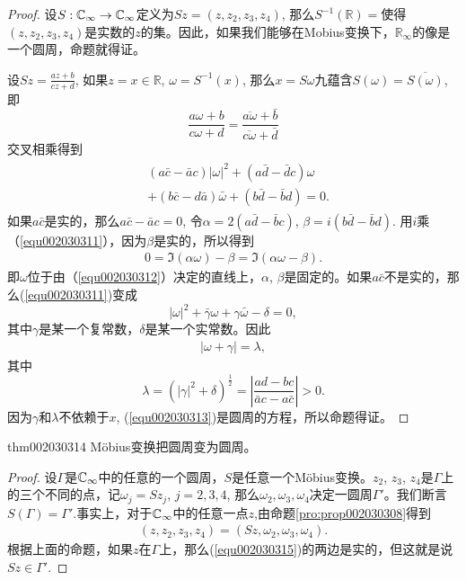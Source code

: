 \begin{proof}
设$S:\mathbb{C}_{\infty} \to \mathbb{C}_{\infty}$定义为$Sz = (z, z_2, z_3, z_4)$, 那么$S^{-1}(\mathbb{R})=$使得$(z,z_2,z_3,z_4)$是实数的$z$的集。因此，如果我们能够在M\:obius变换下，$\mathbb{R}_{\infty}$的像是一个圆周，命题就得证。

设$Sz = \frac{az+b}{cz+d}$, 如果$z=x \in \mathbb{R}$, $\omega = S^{-1}(x)$, 那么$x = S\omega$九蕴含$S(\omega) = \overline{S(\omega)}$, 即
\[
\frac{a\omega + b}{c\omega+d} = \frac{\overline{a\omega} + \bar{b}}{\overline{c\omega} + \bar{d}}
\]
交叉相乘得到
\begin{gather}\label{equ002030311}
\begin{aligned}
&(a\bar{c} - \bar{a}c)|\omega|^2 + (a\bar{d}-\bar{d}c)\omega\\
&+(b\bar{c} - d\bar{a})\bar{\omega} + (b\bar{d} - \bar{b}d) = 0.
\end{aligned}
\end{gather}
如果$a\bar{c}$是实的，那么$a\bar{c} - \bar{a}c = 0$, 令$\alpha = 2(a\bar{d} - \bar{b}c)$, $\beta = i(b\bar{d}-\bar{b}d)$. 用$i$乘（\ref{equ002030311}），因为$\beta$是实的，所以得到
\begin{gather}\label{equ002030312}
0 = \Im{(\alpha\omega)} - \beta = \Im{(\alpha\omega - \beta)}.
\end{gather}
即$\omega$位于由（\ref{equ002030312}）决定的直线上，$\alpha$, $\beta$是固定的。如果$a\bar{c}$不是实的，那么(\ref{equ002030311})变成
\[
|\omega|^2 + \bar{\gamma}\omega + \gamma\bar{\omega} - \delta = 0,
\]
其中$\gamma$是某一个复常数，$\delta$是某一个实常数。因此
\begin{gather}\label{equ002030313}
|\omega + \gamma| = \lambda,
\end{gather}
其中
\[
\lambda = (|\gamma|^2 + \delta)^{\frac{1}{2}} = |\frac{ad-bc}{\bar{a}c - a\bar{c}}| > 0.
\]
因为$\gamma$和$\lambda$不依赖于$x$, (\ref{equ002030313})是圆周的方程，所以命题得证。
\end{proof}

\begin{theorem}{}{thm002030314}
M\"obius变换把圆周变为圆周。
\end{theorem}

\begin{proof}
设$\Gamma$是$\mathbb{C}_{\infty}$中的任意的一个圆周，$S$是任意一个M\"obius变换。$z_2$, $z_3$, $z_4$是$\Gamma$上的三个不同的点，记$\omega_j = Sz_j$, $j=2,3,4$, 那么$\omega_2, \omega_3, \omega_4$决定一圆周$\Gamma'$。我们断言$S(\Gamma) = \Gamma'$.事实上，对于$\mathbb{C}_{\infty}$中的任意一点$z$,由命题\ref{pro:prop002030308}得到
\begin{gather}\label{equ002030315}
(z, z_2, z_3, z_4) = (Sz, \omega_2, \omega_3, \omega_4).
\end{gather}
根据上面的命题，如果$z$在$\Gamma$上，那么(\ref{equ002030315})的两边是实的，但这就是说$Sz \in \Gamma'$.
\end{proof}

